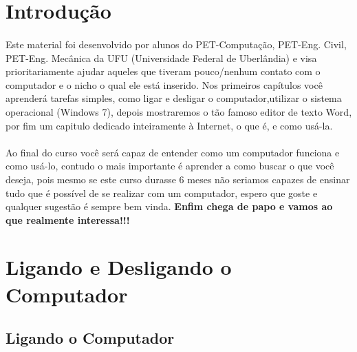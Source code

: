\documentclass[hidelinks,12pt]{article}
\begin{document}
\pagestyle{fancy}
	
\tableofcontents
\listoffigures

{\let\thefootnote\relax{}}

{\let\thefootnote\relax{}}

\newpage

\section{Introdução}
\paragraph{} Este material foi desenvolvido por alunos do PET-Computação, PET-Eng. Civil, PET-Eng. Mecânica da UFU (Universidade Federal de Uberlândia) e visa prioritariamente ajudar aqueles que tiveram pouco/nenhum contato com o computador e o nicho o qual ele
			está inserido. Nos primeiros capítulos você aprenderá tarefas simples, como ligar e desligar o computador,utilizar o sistema operacional (Windows 7), depois mostraremos o tão famoso editor de texto Word, por fim um capitulo dedicado inteiramente à Internet, o que é, e como usá-la.
\paragraph{} Ao final do curso você será capaz de entender como um computador funciona e como usá-lo, contudo o mais importante
			é aprender a como buscar o que você deseja, pois mesmo se este curso durasse 6 meses não seriamos capazes 
			de ensinar tudo que é possível de se realizar com um computador, espero que goste e qualquer sugestão é sempre bem vinda. \textbf{Enfim chega de papo e vamos ao que realmente interessa!!!}

\section{Ligando e Desligando o Computador}
\subsection{Ligando o Computador} 
\end{document}
